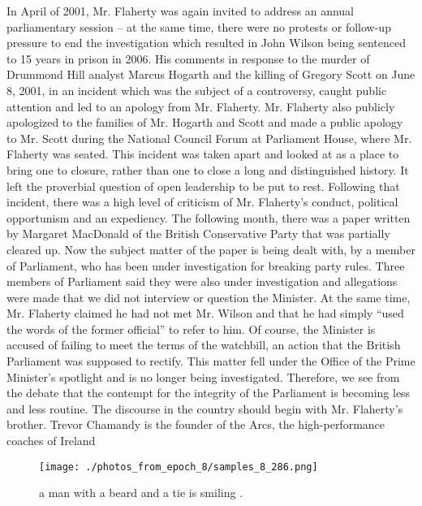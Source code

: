 \documentclass{article}%
\begin{document}
In April of 2001, Mr. Flaherty was again invited to address an annual parliamentary session – at the same time, there were no protests or follow{-}up pressure to end the investigation which resulted in John Wilson being sentenced to 15 years in prison in 2006. His comments in response to the murder of Drummond Hill analyst Marcus Hogarth and the killing of Gregory Scott on June 8, 2001, in an incident which was the subject of a controversy, caught public attention and led to an apology from Mr. Flaherty. Mr. Flaherty also publicly apologized to the families of Mr. Hogarth and Scott and made a public apology to Mr. Scott during the National Council Forum at Parliament House, where Mr. Flaherty was seated. This incident was taken apart and looked at as a place to bring one to closure, rather than one to close a long and distinguished history. It left the proverbial question of open leadership to be put to rest.\newline%
Following that incident, there was a high level of criticism of Mr. Flaherty’s conduct, political opportunism and an expediency. The following month, there was a paper written by Margaret MacDonald of the British Conservative Party that was partially cleared up. Now the subject matter of the paper is being dealt with, by a member of Parliament, who has been under investigation for breaking party rules.\newline%
Three members of Parliament said they were also under investigation and allegations were made that we did not interview or question the Minister. At the same time, Mr. Flaherty claimed he had not met Mr. Wilson and that he had simply “used the words of the former official” to refer to him. Of course, the Minister is accused of failing to meet the terms of the watchbill, an action that the British Parliament was supposed to rectify. This matter fell under the Office of the Prime Minister’s spotlight and is no longer being investigated. Therefore, we see from the debate that the contempt for the integrity of the Parliament is becoming less and less routine.\newline%
The discourse in the country should begin with Mr. Flaherty’s brother.\newline%
Trevor Chamandy is the founder of the Arcs, the high{-}performance coaches of Ireland\newline%

%


\begin{figure}[h!]%
\centering%
\texttt{[image: ./photos\_from\_epoch\_8/samples\_8\_286.png]}%
\caption{a man with a beard and a tie is smiling .}%
\end{figure}

%
\end{document}
